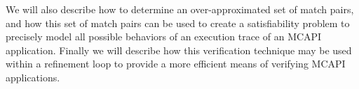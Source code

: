 We will also describe how to determine an over-approximated set of match pairs, and how this
set of match pairs can be used to create a satisfiability problem to precisely
model all possible behaviors of an execution trace of an MCAPI application.
Finally we will describe how this verification technique may be used within a
refinement loop to provide a more efficient means of verifying MCAPI
applications.









